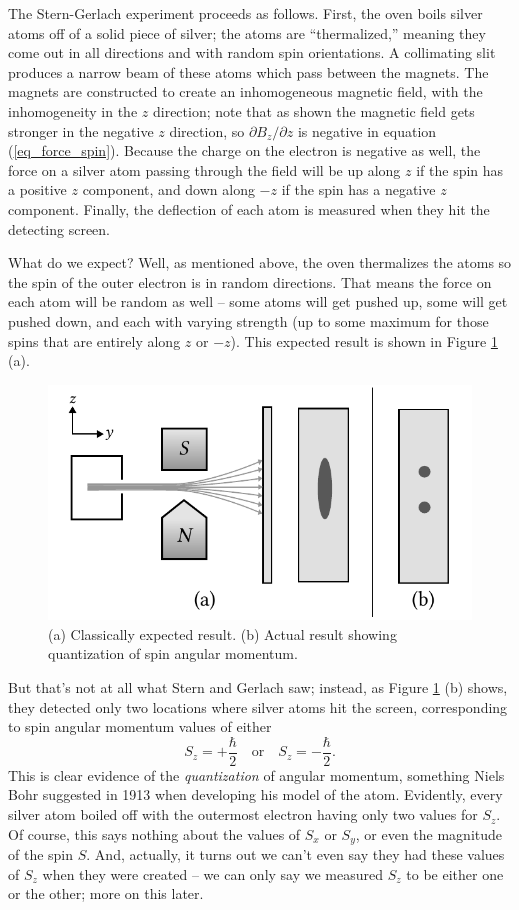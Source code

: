 The Stern-Gerlach experiment proceeds as follows.  First, the oven boils silver atoms off of a solid piece of silver; the atoms are ``thermalized,'' meaning they come out in all directions and with random spin orientations.  A collimating slit produces a narrow beam of these atoms which pass between the magnets.  The magnets are constructed to create an inhomogeneous magnetic field, with the inhomogeneity in the $z$ direction; note that as shown the magnetic field gets stronger in the negative $z$ direction, so $\partial B_z / \partial z$ is negative in equation (\ref{eq_force_spin}).  Because the charge on the electron is negative as well, the force on a silver atom passing through the field will be up along $z$ if the spin has a positive $z$ component, and down along $-z$ if the spin has a negative $z$ component.  Finally, the deflection of each atom is measured when they hit the detecting screen.

What do we expect?  Well, as mentioned above, the oven thermalizes the atoms so the spin of the outer electron is in random directions.  That means the force on each atom will be random as well -- some atoms will get pushed up, some will get pushed down, and each with varying strength (up to some maximum for those spins that are entirely along $z$ or $-z$).  This expected result is shown in Figure \ref{fig_stern_gerlach_result_expected} (a).

\begin{figure}
\centering\includegraphics[width=0.8\linewidth]{Figures/Chapter 1/fig_stern_gerlach_result_expected.pdf}
\caption{(a) Classically expected result.  (b) Actual result showing quantization of spin angular momentum.}
\label{fig_stern_gerlach_result_expected}
\end{figure}

But that's not at all what Stern and Gerlach saw; instead, as Figure \ref{fig_stern_gerlach_result_expected} (b) shows, they detected only two locations where silver atoms hit the screen, corresponding to spin angular momentum values of either 
\[
S_z = +\frac{\hbar}{2} \quad \text{or} \quad S_z = -\frac{\hbar}{2}.
\]
This is clear evidence of the \emph{quantization} of angular momentum, something Niels Bohr suggested in 1913 when developing his model of the atom.  Evidently, every silver atom boiled off with the outermost electron having only two values for $S_z$.  Of course, this says nothing about the values of $S_x$ or $S_y$, or even the magnitude of the spin $S$.  And, actually, it turns out we can't even say they had these values of $S_z$ when they were created -- we can only say we measured $S_z$ to be either one or the other; more on this later.

